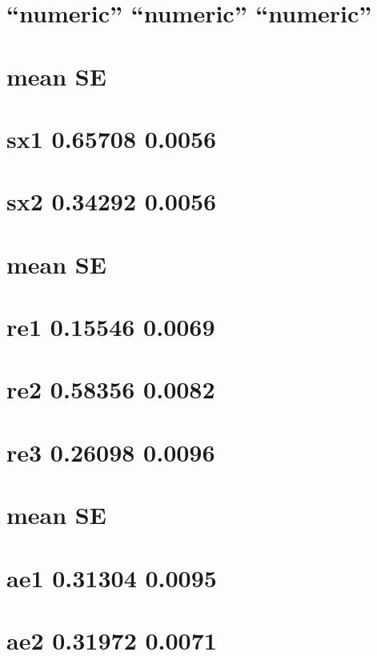 \documentclass[]{book}
\theoremstyle{definition}
\theoremstyle{definition}
\theoremstyle{definition}
\theoremstyle{remark}
\begin{document}
\section{\texorpdfstring{``numeric'' ``numeric''
``numeric''}{numeric numeric numeric}}\label{numeric-numeric-numeric-1}

\section{mean SE}\label{mean-se}

\section{sx1 0.65708 0.0056}\label{sx1-0.65708-0.0056}

\section{sx2 0.34292 0.0056}\label{sx2-0.34292-0.0056}

\section{mean SE}\label{mean-se-1}

\section{re1 0.15546 0.0069}\label{re1-0.15546-0.0069}

\section{re2 0.58356 0.0082}\label{re2-0.58356-0.0082}

\section{re3 0.26098 0.0096}\label{re3-0.26098-0.0096}

\section{mean SE}\label{mean-se-2}

\section{ae1 0.31304 0.0095}\label{ae1-0.31304-0.0095}

\section{ae2 0.31972 0.0071}\label{ae2-0.31972-0.0071}
\end{document}
